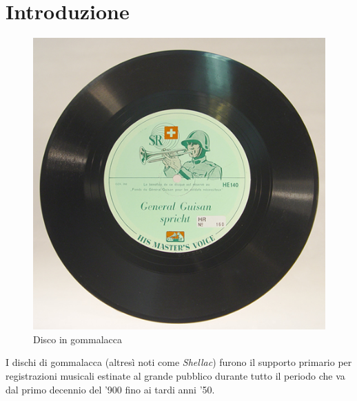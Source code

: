 \section{Introduzione}
\begin{figure}[h!t]
\begin{center}
\includegraphics[scale=0.3]{./img/shellac.jpg}
\caption{Disco in gommalacca}
\end{center}
\end{figure}
I dischi di gommalacca (altres\`i noti come \emph{Shellac}) furono il supporto primario per registrazioni musicali estinate al grande pubblico durante tutto il periodo che va dal primo decennio del '900 fino ai tardi anni '50.

